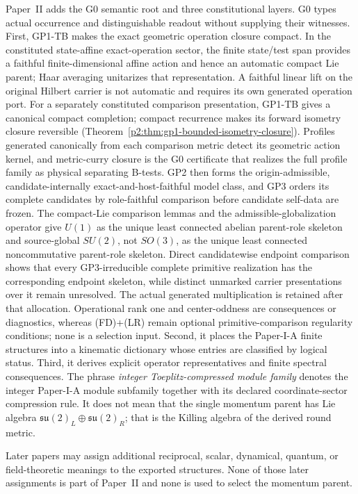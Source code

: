 \documentclass[12pt,a4paper]{article}
\begin{document}
Paper~II adds the G0 semantic root and three constitutional layers.  G0 types
actual occurrence and distinguishable readout without supplying their
witnesses.  First, GP1-TB makes the exact geometric operation closure compact.  In the
constituted state-affine exact-operation sector, the finite state/test span
provides a faithful finite-dimensional affine action and hence an automatic
compact Lie parent; Haar averaging unitarizes that representation.  A
faithful linear lift on the original Hilbert carrier is not automatic and
requires its own generated operation port.  For a separately constituted
comparison presentation, GP1-TB gives a canonical compact completion; compact
recurrence makes its forward isometry closure reversible
(Theorem~\ref{p2:thm:gp1-bounded-isometry-closure}).  Profiles generated
canonically from each comparison metric detect its geometric action kernel,
and metric-curry closure is the G0 certificate that realizes the full profile
family as physical separating B-tests.  GP2 then
forms the origin-admissible, candidate-internally exact-and-host-faithful model
class, and GP3 orders its complete candidates by role-faithful comparison before candidate
self-data are frozen.  The compact-Lie comparison lemmas and the
admissible-globalization operator give \(U(1)\) as the unique least connected
abelian parent-role skeleton and source-global \(SU(2)\), not \(SO(3)\), as
the unique least connected noncommutative parent-role skeleton.  Direct
candidatewise endpoint comparison shows that every GP3-irreducible complete
primitive realization has the corresponding endpoint skeleton, while distinct
unmarked carrier presentations over it remain unresolved.  The actual generated
multiplication is retained after that allocation.
Operational rank one and center-oddness are consequences or diagnostics,
whereas (FD)+(LR) remain optional primitive-comparison regularity conditions;
none is a selection input.
Second, it places the Paper-I-A finite structures into a kinematic dictionary whose entries are classified by logical status.  Third, it derives explicit operator representatives and finite spectral consequences.  The phrase \emph{integer Toeplitz-compressed
module family} denotes the integer Paper-I-A module subfamily together with its
declared coordinate-sector compression rule.  It does not mean that the
single momentum parent has Lie algebra
\(\mathfrak{su}(2)_L\oplus\mathfrak{su}(2)_R\); that is the Killing algebra of
the derived round metric.

Later papers may assign additional reciprocal, scalar, dynamical, quantum, or
field-theoretic meanings to the exported structures.  None of those later
assignments is part of Paper~II and none is used to select the momentum parent.
\end{document}
